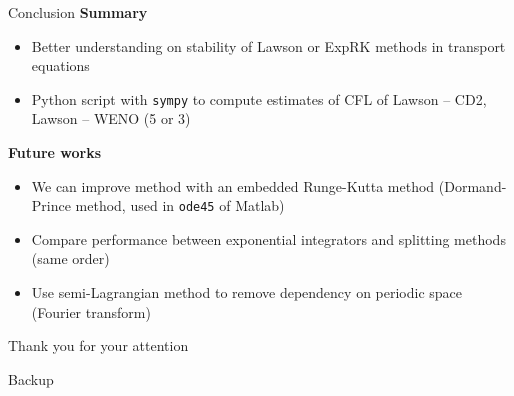 \documentclass{beamer}
\newcommand{\mbold}[1]{{\textbf{\color{PLB}#1}}}
\newcommand{\backupbegin}{
  \newcounter{finalframe}
  \setcounter{finalframe}{\value{framenumber}}
}
\newcommand{\backupend}{
  \setcounter{framenumber}{\value{finalframe}}
}
\begin{document}
\begin{frame}{Conclusion}
  \mbold{Summary}
  \begin{itemize}
    \item Better understanding on stability of Lawson or ExpRK methods in transport equations
    \item Python script with \texttt{sympy} to compute estimates of CFL of Lawson -- CD2, Lawson -- WENO (5 or 3)
  \end{itemize}

  \mbold{Future works}
  \begin{itemize}
    \item We can improve method with an embedded Runge-Kutta method (Dormand-Prince method, used in \texttt{ode45} of Matlab)
    \item Compare performance between exponential integrators and splitting methods (same order)
    \item Use semi-Lagrangian method to remove dependency on periodic space (Fourier transform)
  \end{itemize}
\end{frame}

\begin{frame}[t]
  \vfill
  { Thank you for your attention}
  \vfill
\end{frame}

\appendix
\backupbegin

\begin{frame}[plain]
  \vspace{0.65\textwidth}
  \hfill\footnotesize{Backup}
\end{frame}
\begin{frame}{}
\end{frame}


\backupend
\end{document}
